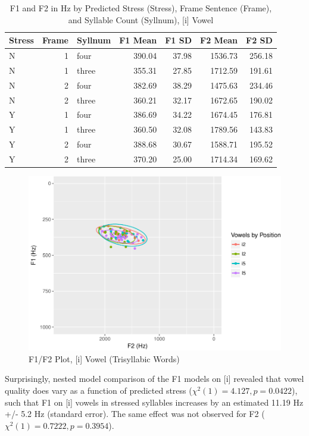 \documentclass[english,man]{apa6}
\theoremstyle{definition}
\theoremstyle{definition}
\theoremstyle{definition}
\theoremstyle{remark}
\begin{document}
\begin{table}

\caption{\label{tab:Table6}F1 and F2 in Hz by Predicted Stress (Stress), Frame Sentence (Frame), and Syllable Count (Syllnum), [i] Vowel}
\centering
\begin{tabular}[t]{l|r|l|r|r|r|r}
\hline
Stress & Frame & Syllnum & F1 Mean & F1 SD & F2 Mean & F2 SD\\
\hline
N & 1 & four & 390.04 & 37.98 & 1536.73 & 256.18\\
\hline
N & 1 & three & 355.31 & 27.85 & 1712.59 & 191.61\\
\hline
N & 2 & four & 382.69 & 38.29 & 1475.63 & 234.46\\
\hline
N & 2 & three & 360.21 & 32.17 & 1672.65 & 190.02\\
\hline
Y & 1 & four & 386.69 & 34.22 & 1674.45 & 176.81\\
\hline
Y & 1 & three & 360.50 & 32.08 & 1789.56 & 143.83\\
\hline
Y & 2 & four & 388.68 & 30.67 & 1588.71 & 195.52\\
\hline
Y & 2 & three & 370.20 & 25.00 & 1714.34 & 169.62\\
\hline
\end{tabular}
\end{table}

\begin{figure}
\centering
\includegraphics{lithuanian_article_files/figure-latex/Figure5-1.pdf}
\caption{\label{fig:Figure5}F1/F2 Plot, {[}i{]} Vowel (Trisyllabic Words)}
\end{figure}

Surprisingly, nested model comparison of the F1 models on {[}i{]}
revealed that vowel quality does vary as a function of predicted stress
(\(\chi^2(1) = 4.127, p = 0.0422\)), such that F1 on {[}i{]} vowels in
stressed syllables increases by an estimated 11.19 Hz +/- 5.2 Hz
(standard error). The same effect was not observed for F2
(\(\chi^2(1) = 0.7222, p = 0.3954\)).
\end{document}
